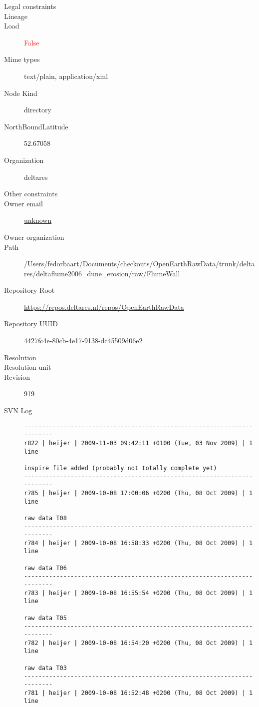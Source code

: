 \documentclass[9]{report}
\begin{document}
\begin{description}
  \item[Legal constraints] 
  \item[Lineage] 
  \item[Load] \textcolor{red}{False}
  \item[Mime types] text/plain, application/xml
  \item[Node Kind] directory
  \item[NorthBoundLatitude] 52.67058
  \item[Organization] deltares
  \item[Other constraints] 
  \item[Owner email] \href{mailto:unknown}{unknown}
  \item[Owner organization] 
  \item[Path] /Users/fedorbaart/Documents/checkouts/OpenEarthRawData/trunk/deltares/deltaflume2006\_dune\_erosion/raw/FlumeWall
  \item[Repository Root] \href{https://repos.deltares.nl/repos/OpenEarthRawData}{https://repos.deltares.nl/repos/OpenEarthRawData}
  \item[Repository UUID] 4427fc4e-80cb-4e17-9138-dc45509d06e2
  \item[Resolution] 
  \item[Resolution unit] 
  \item[Revision] 919
  \item[SVN Log] \begin{verbatim}
------------------------------------------------------------------------
r822 | heijer | 2009-11-03 09:42:11 +0100 (Tue, 03 Nov 2009) | 1 line

inspire file added (probably not totally complete yet)
------------------------------------------------------------------------
r785 | heijer | 2009-10-08 17:00:06 +0200 (Thu, 08 Oct 2009) | 1 line

raw data T08
------------------------------------------------------------------------
r784 | heijer | 2009-10-08 16:58:33 +0200 (Thu, 08 Oct 2009) | 1 line

raw data T06
------------------------------------------------------------------------
r783 | heijer | 2009-10-08 16:55:54 +0200 (Thu, 08 Oct 2009) | 1 line

raw data T05
------------------------------------------------------------------------
r782 | heijer | 2009-10-08 16:54:20 +0200 (Thu, 08 Oct 2009) | 1 line

raw data T03
------------------------------------------------------------------------
r781 | heijer | 2009-10-08 16:52:48 +0200 (Thu, 08 Oct 2009) | 1 line


\end{verbatim}
\end{description}
\end{document}
